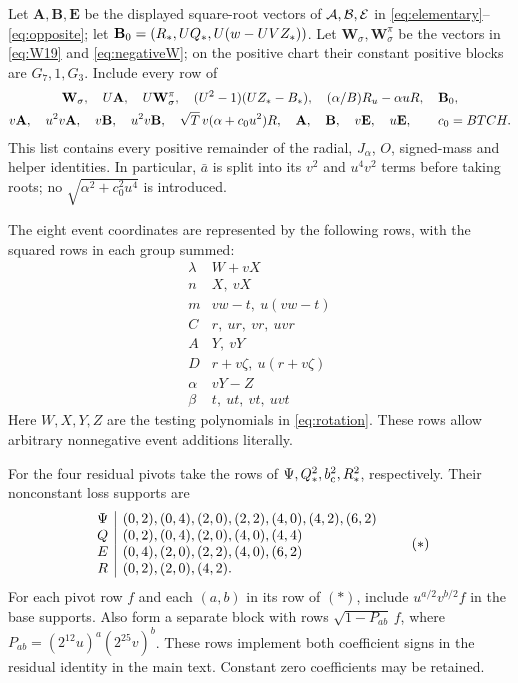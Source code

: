 Let $\mathbf A,\mathbf B,\mathbf E$ be the displayed square-root
vectors of $\mathcal A,\mathcal B,\mathcal E$ in \eqref{eq:elementary}--\eqref{eq:opposite};
let $\mathbf B_0=(R_*,UQ_*,U(w-UVZ_*))$.
Let $\mathbf W_\sigma,\mathbf W^\pi_\sigma$ be the vectors in
\eqref{eq:W19} and \eqref{eq:negativeW}; on the positive chart their
constant positive blocks are $G_7,1,G_3$. Include every row of
\begin{gather*}
 \mathbf W_\sigma,\quad U\mathbf A,\quad
 U\mathbf W^\pi_\sigma,\quad (U^2-1)(UZ_*-B_*),\quad
 (\alpha/B)R_u-\alpha uR,\quad\mathbf B_0,\\
 v\mathbf A,\quad u^2v\mathbf A,\quad
 v\mathbf B,\quad u^2v\mathbf B,\quad
 \sqrt T\,v(\alpha+c_0u^2)R,\quad
 \mathbf A,\quad\mathbf B,\quad v\mathbf E,\quad u\mathbf E,
 \qquad c_0=BTCH.
\end{gather*}
This list contains every positive remainder of the radial, $J_\alpha$,
$O$, signed-mass and helper identities. In particular, $\bar a$ is
split into its $v^2$ and $u^4v^2$ terms before taking roots; no
$\sqrt{\alpha^2+c_0^2u^4}$ is introduced.

The eight event coordinates are represented by the following rows,
with the squared rows in each group summed:
\[
\begin{array}{c|l}
 \lambda&W+vX\\
 n&X,\ vX\\
 m&vw-t,\ u(vw-t)\\
 C&r,\ ur,\ vr,\ uvr\\
 A&Y,\ vY\\
 D&r+v\zeta,\ u(r+v\zeta)\\
 \alpha&vY-Z\\
 \beta&t,\ ut,\ vt,\ uvt
\end{array}
\]
Here $W,X,Y,Z$ are the testing polynomials in \eqref{eq:rotation}.
These rows allow arbitrary nonnegative event additions literally.

For the four residual pivots take the rows of $\Psi,Q_*^2,b_{\mathrm c}^2,R_*^2$,
respectively. Their nonconstant loss supports are
\[
\begin{array}{c|l}
 \Psi&(0,2),(0,4),(2,0),(2,2),(4,0),(4,2),(6,2)\\
 Q&(0,2),(0,4),(2,0),(4,0),(4,4)\\
 E&(0,4),(2,0),(2,2),(4,0),(6,2)\\
 R&(0,2),(2,0),(4,2).
\end{array}\tag{\(*\)}
\]
For each pivot row $f$ and each $(a,b)$ in its row of $(*)$, include
$u^{a/2}v^{b/2}f$ in the base supports. Also form a separate block with
rows $\sqrt{1-P_{ab}}\,f$, where
$P_{ab}=(2^{12}u)^a(2^{25}v)^b$.
These rows implement both coefficient signs in the residual identity
in the main text. Constant zero coefficients may be retained.


